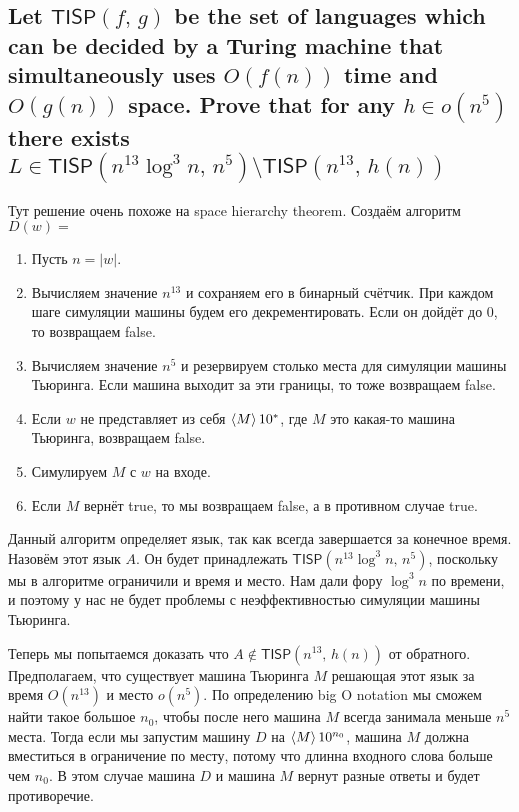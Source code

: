 \documentclass{article}
\begin{document}
  \subsection{Let $\mathsf{TISP}(f,\, g)$ be the set of languages which can be decided by a Turing machine that simultaneously uses $O(f(n))$ time and $O(g(n))$ space. Prove that for any $h \in o(n^5)$ there exists $L \in \mathsf{TISP}(n^{13}\log^3 n,\, n^5) \setminus \mathsf{TISP}(n^{13},\, h(n))$}
  Тут решение очень похоже на space hierarchy theorem.
  Создаём алгоритм $D(w)=$
  \begin{enumerate}
    \item Пусть $n = |w|$.
    \item Вычисляем значение $n^{13}$ и сохраняем его в бинарный счётчик. При каждом шаге симуляции машины будем его декрементировать. Если он дойдёт до 0, то возвращаем false.
    \item Вычисляем значение $n^5$ и резервируем столько места для симуляции машины Тьюринга. Если машина выходит за эти границы, то тоже возвращаем false.
    \item Если $w$ не представляет из себя $\left<M\right>10^*$, где $M$ это какая-то машина Тьюринга, возвращаем false.
    \item Симулируем $M$ с $w$ на входе.
    \item Если $M$ вернёт true, то мы возвращаем false, а в противном случае true.
  \end{enumerate}
  Данный алгоритм определяет язык, так как всегда завершается за конечное время.
  Назовём этот язык $A$.
  Он будет принадлежать $\mathsf{TISP}(n^{13}\log^3 n,\, n^5)$, поскольку мы в алгоритме ограничили и время и место.
  Нам дали фору $\log^3 n$ по времени, и поэтому у нас не будет проблемы с неэффективностью симуляции машины Тьюринга.

  Теперь мы попытаемся доказать что $A \not\in \mathsf{TISP}(n^{13},\, h(n))$ от обратного.
  Предполагаем, что существует машина Тьюринга $M$ решающая этот язык за время $O(n^{13})$ и место $o(n^5)$.
  По определению big O notation мы сможем найти такое большое $n_0$,
  чтобы после него машина $M$ всегда занимала меньше $n^5$ места.
  Тогда если мы запустим машину $D$ на $\left<M\right>10^{n_0}$, машина $M$ должна вместиться в ограничение по месту, потому что длинна входного слова больше чем $n_0$.
  В этом случае машина $D$ и машина $M$ вернут разные ответы и будет противоречие.
\end{document}
